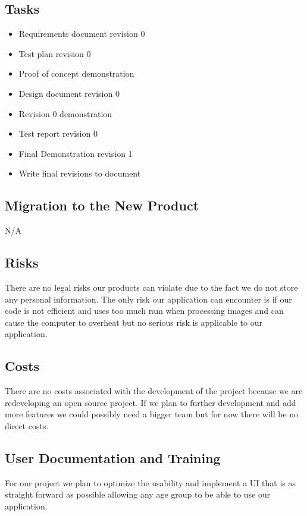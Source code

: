 \documentclass[12pt, titlepage]{article}
\begin{document}
\subsection{Tasks}

\begin{itemize}
\item Requirements document revision 0
\item Test plan revision 0
\item Proof of concept demonstration
\item Design document revision 0
\item Revision 0 demonstration
\item Test report revision 0
\item Final Demonstration revision 1  
\item Write final revisions to document
\end{itemize}

\subsection{Migration to the New Product}

N/A

\subsection{Risks}

There are no legal risks our products can violate due to the fact we do not store any personal information. The only risk our application can encounter is if our code is not efficient and uses too much ram when processing images and can cause the computer to overheat but no serious risk is applicable to our application.

\subsection{Costs}

There are no costs associated with the development of the project because we are redeveloping an open source project. If we plan to further development and add more features we could possibly need a bigger team but for now there will be no direct costs.

\subsection{User Documentation and Training}

For our project we plan to optimize the usability and implement a UI that is as straight forward as possible allowing any age group to be able to use our application.
\end{document}
